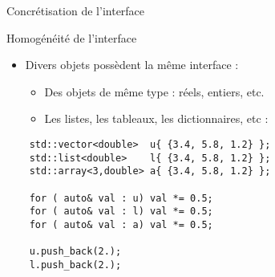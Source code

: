 \documentclass[compress,10pt,aspectratio=169]{beamer}
\begin{document}
\begin{frame}[fragile]{Concrétisation de l'interface}
    \scriptsize
    \begin{block}{\small Homogénéité de l'interface}
    \begin{itemize}
    \item Divers objets possèdent la même interface :
    \begin{itemize}
    \scriptsize
    \item Des objets de même type : réels, entiers, etc.
    \item Les listes, les tableaux, les dictionnaires, etc :
    \end{itemize}
    \end{itemize}
    \end{block}
  \begin{verbatim}
    std::vector<double>  u{ {3.4, 5.8, 1.2} };
    std::list<double>    l{ {3.4, 5.8, 1.2} };
    std::array<3,double> a{ {3.4, 5.8, 1.2} };
    
    for ( auto& val : u) val *= 0.5;
    for ( auto& val : l) val *= 0.5;
    for ( auto& val : a) val *= 0.5;
    
    u.push_back(2.);
    l.push_back(2.);
  \end{verbatim}
    \end{frame}
  
\end{document}
